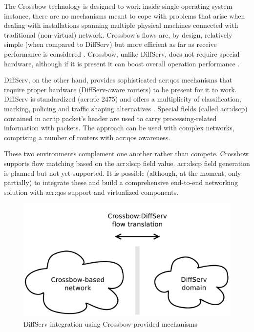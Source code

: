 \documentclass[11pt]{book}
\begin{document}
        The Crossbow technology is designed to work inside single operating system instance, there are no mechanisms
        meant to cope with problems that arise when dealing with installations spanning multiple physical machines
        connected with traditional (non-virtual) network. Crossbow's flows are, by design, relatively simple (when
        compared to DiffServ) but more efficient as far as receive performance is considered \cite{xbow-vertically}.
        Crossbow, unlike DiffServ, does not require special hardware, although if it is present it can boost overall
        operation performance \cite{xbow-vertically}.

        DiffServ, on the other hand, provides sophisticated \gls{acr:qos} mechanisms that require proper hardware
        (DiffServ-aware routers) to be present for it to work. DiffServ is standardized (\gls{acr:rfc} 2475) and offers
        a multiplicity of classification, marking, policing and traffic shaping alternatives \cite{rfc2475}. Special
        fields (called \gls{acr:dscp}) contained in \gls{acr:ip} packet's header are used to carry processing-related
        information with packets. The approach can be used with complex networks, comprising a number of routers with
        \gls{acr:qos} awareness.

        These two environments complement one another rather than compete. Crossbow supports flow matching based on the
        \gls{acr:dscp} field value. \gls{acr:dscp} field generation is planned but not yet supported. It is possible
        (although, at the moment, only partially) to integrate these and build a comprehensive end-to-end networking
        solution with \gls{acr:qos} support and virtualized components.

        \begin{figure}[H]
          \begin{center}
            \includegraphics[width=.7\textwidth]{img/solaris/xbow-diffserv.pdf}
          \end{center}

          \caption{DiffServ integration using Crossbow-provided mechanisms}
        \end{figure}
\end{document}
